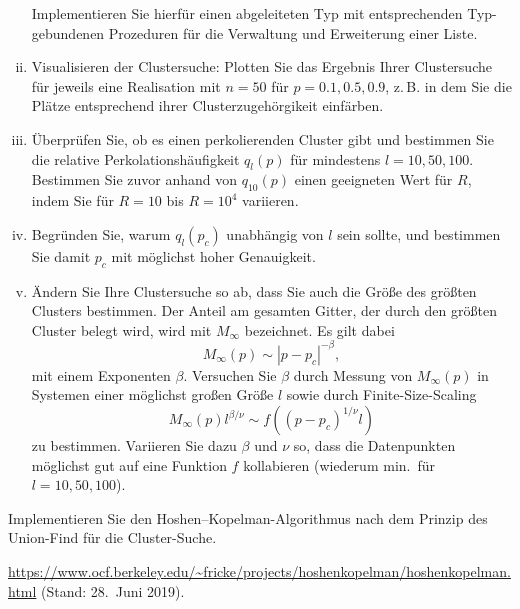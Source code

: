 \begin{question}[subtitle=Perkolationschwelle]
\begin{enumerate}[(i)]
    Implementieren Sie hierfür einen abgeleiteten Typ mit entsprechenden Typ-gebundenen Prozeduren für die Verwaltung und Erweiterung einer Liste.
  \item Visualisieren der Clustersuche: Plotten Sie das Ergebnis Ihrer Clustersuche für jeweils eine Realisation mit $n = 50$ für $p = 0.1, 0.5, 0.9$, z.\,B. in dem Sie die Plätze entsprechend ihrer Clusterzugehörgikeit einfärben.
  \item Überprüfen Sie, ob es einen perkolierenden Cluster gibt und bestimmen Sie die relative Perkolationshäufigkeit $q_l(p)$ für mindestens $l = 10, 50, 100$.
    Bestimmen Sie zuvor anhand von $q_{10}(p)$ einen geeigneten Wert für $R$, indem Sie für $R = 10$ bis $R = 10^4$ variieren.
  \item Begründen Sie, warum $q_l(p_c)$ unabhängig von $l$ sein sollte, und bestimmen Sie damit $p_c$ mit möglichst hoher Genauigkeit.
  \item Ändern Sie Ihre Clustersuche so ab, dass Sie auch die Größe des größten Clusters bestimmen.
    Der Anteil am gesamten Gitter, der durch den größten Cluster belegt wird, wird mit $M_∞$ bezeichnet.
    Es gilt dabei
    \begin{equation}
      M_∞ (p) \sim |p - p_c|^{-β},
    \end{equation}
    mit einem Exponenten $β$.
    Versuchen Sie $β$ durch Messung von $M_∞(p)$ in Systemen einer möglichst großen Größe $l$ sowie durch Finite-Size-Scaling
    \begin{equation}
      M_∞(p) l^{β/ν} \sim f\left( (p - p_c)^{1/ν} l \right)
    \end{equation}
    zu bestimmen.
    Variieren Sie dazu $β$ und $ν$ so, dass die Datenpunkten möglichst gut auf eine Funktion $f$ kollabieren (wiederum min.\ für $l = 10, 50, 100$).
  \end{enumerate}
\end{question}

\begin{question}[subtitle=Union-Find-Algorithmus]
  Implementieren Sie den Hoshen--Kopelman-Algorithmus nach dem Prinzip des Union-Find für die Cluster-Suche.

  \url{https://www.ocf.berkeley.edu/~fricke/projects/hoshenkopelman/hoshenkopelman.html} (Stand: 28.\ Juni 2019).
\end{question}
